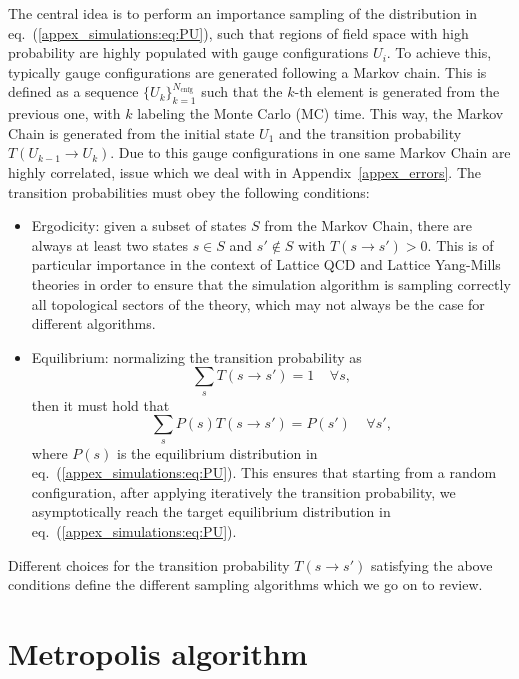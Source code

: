 The central idea is to perform an importance sampling of the distribution in eq.~(\ref{appex_simulations:eq:PU}), such that regions of field space with high probability are highly populated with gauge configurations $U_i$.  To achieve this, typically gauge configurations are generated following a Markov chain. This is defined as a sequence $\{U_k\}_{k=1}^{N_{\textrm{cnfg}}}$ such that the $k$-th element is generated from the previous one, with $k$ labeling the Monte Carlo (MC) time. This way, the Markov Chain is generated from the initial state $U_1$ and the transition probability $T(U_{k-1}\rightarrow U_k)$. Due to this gauge configurations in one same Markov Chain are highly correlated, issue which we deal with in Appendix~\ref{appex_errors}. The transition probabilities must obey the following conditions:
\begin{itemize}
\item Ergodicity: given a subset of states $S$ from the Markov Chain, there are always at least two states $s\in S$ and $s'\notin S$ with $T(s\rightarrow s')>0$. This is of particular importance in the context of Lattice QCD and Lattice Yang-Mills theories in order to ensure that the simulation algorithm is sampling correctly all topological sectors of the theory, which may not always be the case for different algorithms.
\item Equilibrium: normalizing the transition probability as
\begin{equation}
\sum_sT(s\rightarrow s')=1\;\;\;\;\forall s,
\end{equation}
then it must hold that
\begin{equation}
\sum_sP(s)T(s\rightarrow s')=P(s')\;\;\;\;\forall s',
\end{equation}
where $P(s)$ is the equilibrium distribution in eq.~(\ref{appex_simulations:eq:PU}). This ensures that starting from a random configuration, after applying iteratively the transition probability, we asymptotically reach the target equilibrium distribution in eq.~(\ref{appex_simulations:eq:PU}). 
\end{itemize}

Different choices for the transition probability $T(s\rightarrow s')$ satisfying the above conditions define the different sampling algorithms which we go on to review. 

\section{Metropolis algorithm}


